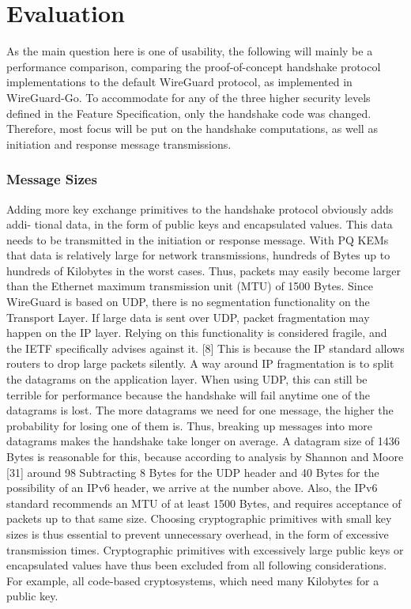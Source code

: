 \chapter{Evaluation}
\label{chap:Evaluation}

As the main question here is one of usability, the following will mainly be a performance comparison, comparing the proof-of-concept handshake protocol implementations to the default WireGuard protocol, as implemented in WireGuard-Go. To accommodate for any of the three higher security levels deﬁned in the Feature Speciﬁcation, only the handshake code was changed. Therefore, most focus will be put on the handshake computations, as well as initiation and response message transmissions.
\subsection{Message Sizes}
Adding more key exchange primitives to the handshake protocol obviously adds addi- tional data, in the form of public keys and encapsulated values. This data needs to be transmitted in the initiation or response message.
With PQ KEMs that data is relatively large for network transmissions, hundreds of Bytes up to hundreds of Kilobytes in the worst cases. Thus, packets may easily become larger than the Ethernet maximum transmission unit (MTU) of 1500 Bytes.
Since WireGuard is based on UDP, there is no segmentation functionality on the Transport Layer. If large data is sent over UDP, packet fragmentation may happen on the IP layer. Relying on this functionality is considered fragile, and the IETF speciﬁcally advises against it. [8] This is because the IP standard allows routers to drop large packets silently.
A way around IP fragmentation is to split the datagrams on the application layer.
When using UDP, this can still be terrible for performance because the handshake will fail anytime one of the datagrams is lost. The more datagrams we need for one message, the higher the probability for losing one of them is. Thus, breaking up messages into more datagrams makes the handshake take longer on average.
A datagram size of 1436 Bytes is reasonable for this, because according to analysis by Shannon and Moore [31] around 98%
Subtracting 8 Bytes for the UDP header and 40 Bytes for the possibility of an IPv6 header, we arrive at the number above. Also, the IPv6 standard recommends an MTU of at least 1500 Bytes, and requires acceptance of packets up to that same size. 
Choosing cryptographic primitives with small key sizes is thus essential to prevent unnecessary overhead, in the form of excessive transmission times. Cryptographic primitives with excessively large public keys or encapsulated values have thus been excluded from all following considerations. For example, all code-based cryptosystems, which need many Kilobytes for a public key.

